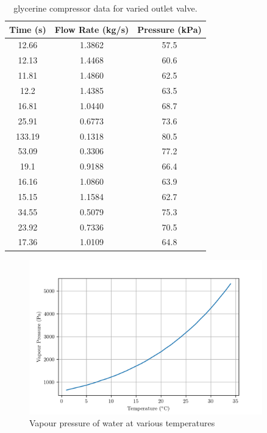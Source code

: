 \documentclass{article}
\begin{document}
\begin{table}[H]
    \centering
    \begin{tabular}{ccc}
        \hline
        Time (s)& Flow Rate (kg/s) & Pressure (kPa) \\
        \hline
        12.66 & 1.3862 & 57.5 \\
        12.13 & 1.4468 & 60.6 \\
        11.81 & 1.4860 & 62.5 \\
        12.2  & 1.4385  & 63.5 \\
        16.81 & 1.0440 & 68.7 \\
        25.91 & 0.6773 & 73.6 \\
        133.19 & 0.1318 & 80.5 \\
        53.09 & 0.3306 & 77.2 \\
        19.1  & 0.9188 & 66.4 \\
        16.16 & 1.0860 & 63.9 \\
        15.15 & 1.1584 & 62.7 \\
        34.55 & 0.5079 & 75.3 \\
        23.92 & 0.7336 & 70.5 \\
        17.36 & 1.0109   & 64.8 \\
        \hline
    \end{tabular}
    \caption{glycerine compressor data for varied outlet valve.}
    \label{tab:glycerine_outlet_data}
\end{table}


\begin{figure}[H]
    \centering
    \includegraphics[width=0.9\textwidth]{vapour_pressure_water.png}
    \caption{Vapour pressure of water at various temperatures \cite{vapour_pressure}}
    \label{fig:vapour_pressure_water}
\end{figure}
\end{document}
